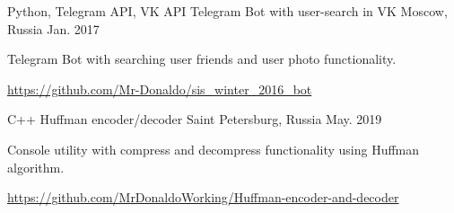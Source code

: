 

\begin{cventries}

  \cventry
    {Python, Telegram API, VK API} %
    {Telegram Bot with user-search in VK} %
    {Moscow, Russia} %
    {Jan. 2017} %
    {
      \begin{cvitems} %
        \item {Telegram Bot with searching user friends and user photo functionality.}
        \item {\url{https://github.com/Mr-Donaldo/sis_winter_2016_bot}}
      \end{cvitems}
    }


  \cventry
    {C++}%
    {Huffman encoder/decoder} %
    {Saint Petersburg, Russia} %
    {May. 2019} %
    {
      \begin{cvitems} %
        \item {Console utility with compress and decompress functionality using Huffman algorithm.}
        \item {\url{https://github.com/MrDonaldoWorking/Huffman-encoder-and-decoder}}
      \end{cvitems}
    }


\end{cventries}
